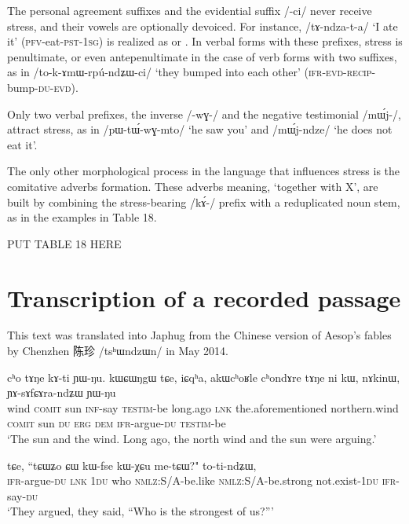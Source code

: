 \documentclass[12pt]{article}
\newcommand{\ipa}[1]{\mbox{\phon/#1/}}
\newcommand{\phonet}[1]{\mbox{\phon[#1]}}
\newcommand{\ipab}[1]{{\phon#1}}
\newcommand{\zh}[1]{{\cn #1}}
\newcommand{\gltt}{ \vspace{-1em}  \glt}
\begin{document}
The personal agreement suffixes and the evidential suffix \ipa{-ci} never receive stress, and their vowels are optionally devoiced. For instance, \ipa{tɤ-ndza-t-a} `I ate it' (\textsc{pfv}-eat-\textsc{pst-1sg}) is realized as \phonet{tɤndzátḁ} or \phonet{tɤndzáta}. In verbal forms with these prefixes, stress is penultimate, or even antepenultimate in the case of verb forms with two suffixes, as in \ipa{to-k-ɤmɯ-rpú-ndʑɯ-ci} `they bumped into each other' (\textsc{ifr}-\textsc{evd}-\textsc{recip}-bump-\textsc{du-evd}).

Only two verbal prefixes, the inverse \ipa{-wɣ-} and the negative testimonial \ipa{mɯ́j-}, attract stress, as in \ipa{pɯ-tɯ́-wɣ-mto} `he saw you' and \ipa{mɯ́j-ndze} `he does not eat it'.
    
The only other morphological process in the language that influences stress is the comitative adverbs formation. These adverbs meaning, `together with X', are built by combining the stress-bearing \ipa{kɤ́-}  prefix with a reduplicated noun stem, as in the examples in Table 18.

 PUT TABLE 18 HERE
   
     \section*{Transcription of a recorded passage}

   This text was translated into Japhug from the Chinese version of Aesop's fables by Chenzhen \zh{陈珍} \ipa{tsʰɯndzɯn} in May 2014. 
   
 
\begin{myexe} 
\gll  \ipab{qale} \ipab{cʰo} \ipab{tɤŋe} \ipab{kɤ-ti} \ipab{ɲɯ-ŋu.} \ipab{kɯɕɯŋgɯ} \ipab{tɕe,} \ipab{iɕqʰa,} \ipab{akɯcʰoʁle}   \ipab{cʰondɤre} \ipab{tɤŋe} \ipab{ni} \ipab{kɯ,} \ipab{nɤkinɯ,} \ipab{ɲɤ-sɤfɕɤra-ndʑɯ} \ipab{ɲɯ-ŋu}\\ 
 wind \textsc{comit} sun    \textsc{inf}-say \textsc{testim}-be   long.ago     \textsc{lnk}  the.aforementioned northern.wind  \textsc{comit}     sun    \textsc{du}  \textsc{erg} \textsc{dem} \textsc{ifr}-argue-\textsc{du}    \textsc{testim}-be\\ 
 \gltt  `The sun and the wind. Long ago, the north wind and the sun were arguing.'
\end{myexe} 
 
 \begin{myexe} 
\gll  \ipab{ɲɤ-sɤfɕɤra-ndʑɯ} \ipab{tɕe,} \ipab{``tɕɯʑo} \ipab{ɕɯ} \ipab{kɯ-fse} \ipab{kɯ-χɕu} \ipab{me-tɕɯ?"} \ipab{to-ti-ndʑɯ,} \\ 
 \textsc{ifr}-argue-\textsc{du}    \textsc{lnk}  1\textsc{du}     who \textsc{nmlz}:S/A-be.like \textsc{nmlz}:S/A-be.strong not.exist-1\textsc{du}  \textsc{ifr}-say-\textsc{du}\\ 
 \gltt  `They argued, they said, ``Who is the strongest of us?'''
\end{myexe} 
\end{document}
